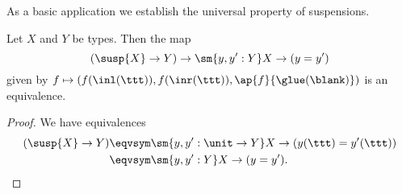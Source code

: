 \begin{comment}
\begin{cor}
Consider two commuting squares
\begin{equation*}
\begin{tikzcd}
S \arrow[r,"g"] \arrow[d,swap,"f"] & B \arrow[d,"j"] & S \arrow[r,"g"] \arrow[d,swap,"f"] & B \arrow[d,"{j'}"] \\
A \arrow[r,swap,"i"] & X & A \arrow[r,swap,"{i'}"] & {X'}
\end{tikzcd}
\end{equation*}
with homotopies $H:i\circ f\htpy j\circ g$ and $H':i'\circ f\htpy j'\circ g$. Furthermore, consider a map
\begin{equation*}
h:X\to X'
\end{equation*}
equipped with
\begin{align*}
K & : h\circ i\htpy i' \\
L & : h\circ j\htpy j' \\
M & : \ct{(h\cdot H)}{(L\cdot g)} \htpy \ct{(K\cdot f)}{H'}.
\end{align*}
If any two of the following three properties hold, then so does the third:
\begin{enumerate}
\item $X$ is a pushout.
\item $X'$ is a pushout.
\item $h$ is an equivalence.
\end{enumerate}
\end{cor}
\end{comment}

As a basic application we establish the universal property of suspensions.
\begin{cor}
Let $X$ and $Y$ be types. Then the map
\begin{equation*}
(\susp{X}\to Y)\to \sm{y,y':Y} X\to (y=y')
\end{equation*}
given by $f\mapsto (f(\inl(\ttt)),f(\inr(\ttt)),\ap{f}{\glue(\blank)})$ is an equivalence.
\end{cor}

\begin{proof}
We have equivalences
\begin{align*}
(\susp{X}\to Y) & \eqvsym \sm{y,y':\unit \to Y} X\to (y(\ttt)=y'(\ttt)) \\
& \eqvsym \sm{y,y':Y} X\to (y=y').\qedhere
\end{align*}
\end{proof}

